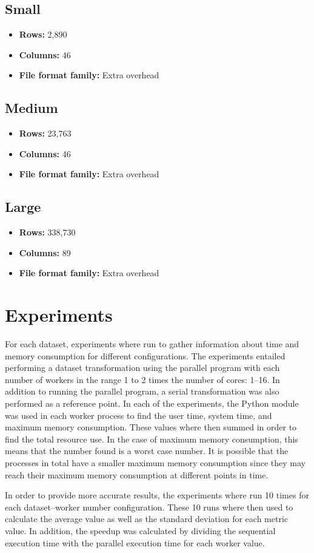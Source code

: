 \subsection{Small}
\begin{itemize}
  \item \textbf{Rows:} 2,890
  \item \textbf{Columns:} 46
  \item \textbf{File format family:} Extra overhead
\end{itemize}

\subsection{Medium}
\begin{itemize}
  \item \textbf{Rows:} 23,763
  \item \textbf{Columns:} 46
  \item \textbf{File format family:} Extra overhead
\end{itemize}

\subsection{Large}
\begin{itemize}
  \item \textbf{Rows:} 338,730
  \item \textbf{Columns:} 89
  \item \textbf{File format family:} Extra overhead
\end{itemize}

\section{Experiments}
For each dataset, experiments where run to gather information about time and memory consumption for different configurations.
The experiments entailed performing a dataset transformation using the parallel program with each number of workers in the range 1 to 2 times the number of cores: 1--16.
In addition to running the parallel program, a serial transformation was also performed as a reference point.
In each of the experiments, the Python  module was used in each worker process to find the user time, system time, and maximum memory consumption.
These values where then summed in order to find the total resource use. In the case of maximum memory consumption, this means that the number found is a worst case
number. It is possible that the processes in total have a smaller maximum memory consumption since they may reach their maximum memory consumption at different
points in time.

In order to provide more accurate results, the experiments where run 10 times for each dataset--worker number configuration. These 10 runs where then used to calculate the
average value as well as the standard deviation for each metric value. In addition, the speedup was calculated by dividing the sequential execution time with the parallel execution
time for each worker value.
